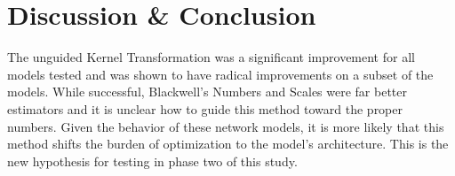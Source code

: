 \documentclass{article}
\theoremstyle{definition}
\begin{document}












\section{Discussion \& Conclusion}

The unguided Kernel Transformation was a significant improvement for all models tested and was shown to have radical improvements on a subset of the models.  While successful, Blackwell's Numbers and Scales were far better estimators and it is unclear how to guide this method toward the proper numbers.  Given the behavior of these network models, it is more likely that this method shifts the burden of optimization to the model's architecture.  This is the new hypothesis for testing in phase two of this study.  




\end{document}
